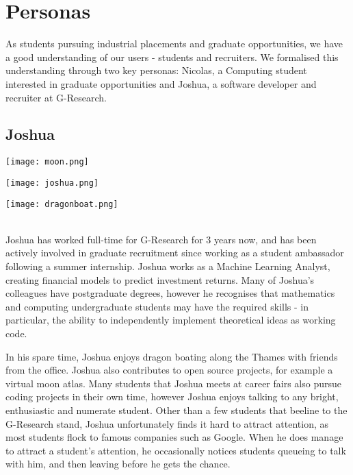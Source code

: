 \section{Personas}
As students pursuing industrial placements and graduate opportunities, we have a good understanding of our users - students and recruiters. We formalised this understanding through two key personas: Nicolas, a Computing student interested in graduate opportunities and Joshua, a software developer and recruiter at G-Research.
\subsection{Joshua}
\begin{minipage}{.333\textwidth}
  \centering
  \texttt{[image: moon.png]}
\end{minipage}%
\begin{minipage}{.333\textwidth}
  \centering
  \texttt{[image: joshua.png]}
\end{minipage}
\begin{minipage}{.333\textwidth}
  \centering
  \texttt{[image: dragonboat.png]}
\end{minipage}\\

Joshua has worked full-time for G-Research for 3 years now, and has been actively involved in graduate recruitment since working as a student ambassador following a summer internship. Joshua works as a Machine Learning Analyst, creating financial models to predict investment returns. Many of Joshua's colleagues have postgraduate degrees, however he recognises that mathematics and computing undergraduate students may have the required skills - in particular, the ability to independently implement theoretical ideas as working code. 

In his spare time, Joshua enjoys dragon boating along the Thames with friends from the office. Joshua also contributes to open source projects, for example a virtual moon atlas. Many students that Joshua meets at career fairs also pursue coding projects in their own time, however Joshua enjoys talking to any bright, enthusiastic and numerate student. Other than a few students that beeline to the G-Research stand, Joshua unfortunately finds it hard to attract attention, as most students flock to famous companies such as Google. When he does manage to attract a student's attention, he occasionally notices students queueing to talk with him, and then leaving before he gets the chance. 

